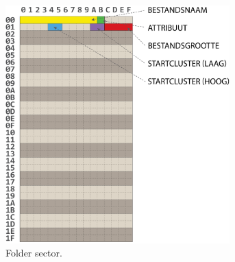 \begin{figure}[h!]
    \begin{subfigure}[t]{0.6\textwidth}
        \centering
        \includegraphics[width=0.95\textwidth]{img/folder-cluster.png}
        \caption{Folder sector.}
        \label{fig:folder-cluster}
    \end{subfigure}%
    ~ 
    \begin{subfigure}[t]{0.4\textwidth}
        \centering

\end{subfigure}
\end{figure}
